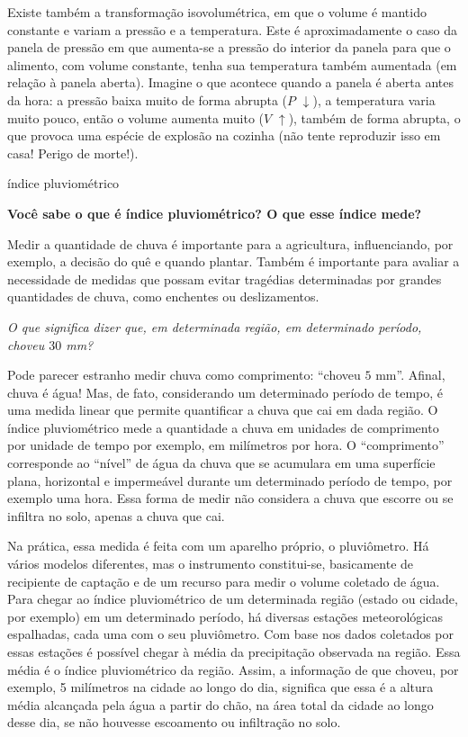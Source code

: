 \begin{reflection}{}
Existe também a transformação isovolumétrica, em que o volume é mantido constante e variam a pressão e a temperatura. Este é aproximadamente o caso da panela de pressão em que aumenta-se a pressão do interior da panela para que o alimento, com volume constante, tenha sua temperatura também aumentada (em relação à panela aberta). Imagine o que acontece quando a panela é aberta antes da hora: a pressão baixa muito de forma abrupta ($P$ \(\downarrow\)), a temperatura varia muito pouco, então o volume aumenta muito ($V$ \(\uparrow\)), também de forma abrupta, o que provoca uma espécie de explosão na cozinha (não tente reproduzir isso em casa! Perigo de morte!).
\end{reflection}

\begin{task}{índice pluviométrico}



\textbf{Você sabe o que é índice pluviométrico? O que esse índice mede?}

Medir a quantidade de chuva é importante para a agricultura, influenciando, por exemplo, a decisão do quê e quando plantar.  Também é importante para avaliar a necessidade de medidas que possam evitar tragédias determinadas por grandes quantidades de chuva, como enchentes ou deslizamentos.

\emph{O que significa dizer que, em determinada região, em determinado período, choveu $30$ mm?}

Pode parecer estranho medir chuva como comprimento: “choveu $5$ mm”. Afinal, chuva é água! Mas, de fato, considerando um determinado período de tempo, é uma medida linear que permite quantificar a chuva que cai em dada região. O índice pluviométrico mede a quantidade a chuva em unidades de comprimento por unidade de tempo \textendash{} por exemplo, em milímetros por hora. O “comprimento” corresponde ao “nível” de água da chuva que se acumulara em uma superfície plana, horizontal e impermeável durante um determinado período de tempo, por exemplo uma hora. Essa forma de medir não considera a chuva que escorre ou se infiltra no solo, apenas a chuva que cai.

Na prática, essa medida é feita com um aparelho próprio, o pluviômetro. Há vários modelos diferentes, mas o instrumento constitui-se, basicamente de recipiente de captação e de um recurso para medir o volume coletado de água. Para chegar ao índice pluviométrico de um determinada região (estado ou cidade, por exemplo) em um determinado período, há diversas estações meteorológicas espalhadas, cada uma com o seu pluviômetro. Com base nos dados coletados por essas estações é possível chegar à média da precipitação observada na região. Essa média é o índice pluviométrico da região. Assim, a informação de que choveu, por exemplo, 5 milímetros na cidade ao longo do dia, significa que essa é a altura média alcançada pela água a partir do chão, na área total da cidade ao longo desse dia, se não houvesse escoamento ou infiltração no solo.


\end{task}
